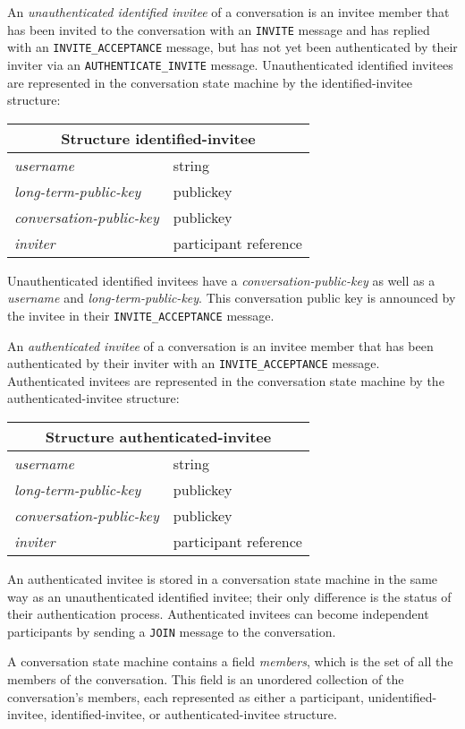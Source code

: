 \documentclass{article}
\def\message#1{\texttt{#1}}
\def\smfield#1{\textsl{#1}}
\def\type#1{\textsf{#1}}
\newenvironment{struct}[1]{
\newcommand{\structfield}[2]{
\smfield{##1} & \type{##2} \\
\hline
}
\par
\vspace{-\medskipamount}
\hspace{2em minus 2em}\begin{tabular}{|l|l|}
\hline
\multicolumn{2}{|c|}{Structure \type{#1}} \\
\hline
\hline
}{
\end{tabular}
\vspace{-\medskipamount}
\par
}
\begin{document}
An \emph{unauthenticated identified invitee} of a conversation is an invitee member that has been invited to the conversation with an \message{INVITE} message and has replied with an \message{INVITE\_ACCEPTANCE} message, but has not yet been authenticated by their inviter via an \message{AUTHENTICATE\_INVITE} message.
Unauthenticated identified invitees are represented in the conversation state machine by the \type{identified-invitee} structure:
\begin{struct}{identified-invitee}
\structfield{username}{string}
\structfield{long-term-public-key}{publickey}
\structfield{conversation-public-key}{publickey}
\structfield{inviter}{participant reference}
\end{struct}
Unauthenticated identified invitees have a \smfield{conversation-public-key} as well as a \smfield{username} and \smfield{long-term-public-key}.
This conversation public key is announced by the invitee in their \message{INVITE\_ACCEPTANCE} message.

An \emph{authenticated invitee} of a conversation is an invitee member that has been authenticated by their inviter with an \message{INVITE\_ACCEPTANCE} message.
Authenticated invitees are represented in the conversation state machine by the \type{authenticated-invitee} structure:
\begin{struct}{authenticated-invitee}
\structfield{username}{string}
\structfield{long-term-public-key}{publickey}
\structfield{conversation-public-key}{publickey}
\structfield{inviter}{participant reference}
\end{struct}
An authenticated invitee is stored in a conversation state machine in the same way as an unauthenticated identified invitee; their only difference is the status of their authentication process.
Authenticated invitees can become independent participants by sending a \message{JOIN} message to the conversation.


A conversation state machine contains a field \smfield{members}, which is the set of all the members of the conversation.
This field is an unordered collection of the conversation's members, each represented as either a \type{participant}, \type{unidentified-invitee}, \type{identified-invitee}, or \type{authenticated-invitee} structure.
\end{document}
